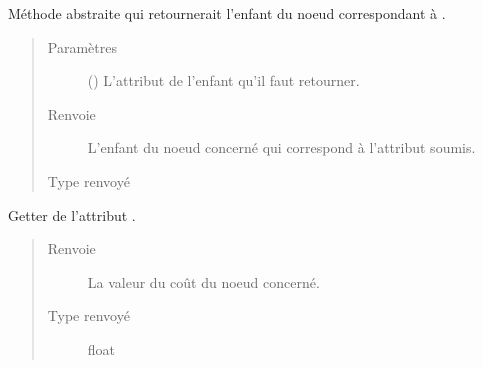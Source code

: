 \documentclass[letterpaper,10pt,french]{sphinxmanual}
\begin{document}
\begin{fulllineitems}
\begin{fulllineitems}
\label{\detokenize{index:StrategyTree.NodeST.get_child_by_attribute}}
Méthode abstraite qui retournerait l’enfant du noeud correspondant à
.
\begin{quote}\begin{description}
\item[{Paramètres}] \leavevmode
{} () \textendash{} L’attribut de l’enfant qu’il faut retourner.

\item[{Renvoie}] \leavevmode
{} \textendash{} L’enfant du noeud concerné qui correspond à l’attribut soumis.

\item[{Type renvoyé}] \leavevmode
{\hyperref[\detokenize{index:StrategyTree.NodeST}]{}}

\end{description}\end{quote}

\end{fulllineitems}


\begin{fulllineitems}
\label{\detokenize{index:StrategyTree.NodeST.get_cost}}
Getter de l’attribut .
\begin{quote}\begin{description}
\item[{Renvoie}] \leavevmode
{} \textendash{} La valeur du coût du noeud concerné.

\item[{Type renvoyé}] \leavevmode
float

\end{description}\end{quote}

\end{fulllineitems}



\end{fulllineitems}
\end{document}
